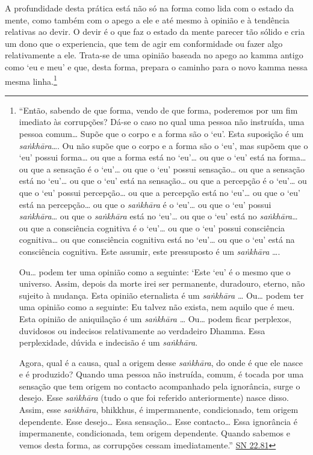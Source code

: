 A profundidade desta prática está não só na forma como lida com o estado da mente, como também com o apego a ele e até mesmo à opinião e à tendência relativas ao devir. O devir é o que faz o estado da mente parecer tão sólido e cria um dono que o experiencia, que tem de agir em conformidade ou fazer algo relativamente a ele. Trata-se de uma opinião baseada no apego ao kamma antigo como `eu e meu' e que, desta forma, prepara o caminho para o novo kamma nessa mesma linha.\footnote{``Então, sabendo de que forma, vendo de que forma, poderemos por um fim imediato às corrupções? Dá-se o caso no qual uma pessoa não instruída, uma pessoa comum\ldots{} Supõe que o corpo e a forma são o `eu'. Esta suposição é um \emph{saṅkhāra}\ldots{}. Ou não supõe que o corpo e a forma são o `eu', mas supõem que o `eu' possui forma\ldots{} ou que a forma está no `eu'\ldots{} ou que o `eu' está na forma\ldots{} ou que a sensação é o `eu'\ldots{} ou que o `eu' possui sensação\ldots{} ou que a sensação está no `eu'\ldots{} ou que o `eu' está na sensação\ldots{} ou que a percepção é o `eu'\ldots{} ou que o `eu' possui percepção\ldots{} ou que a percepção está no `eu'\ldots{} ou que o `eu' está na percepção\ldots{} ou que o \emph{saṅkhāra} é o `eu'\ldots{} ou que o `eu' possui \emph{saṅkhāra}\ldots{} ou que o \emph{saṅkhāra} está no `eu'\ldots{} ou que o `eu' está no \emph{saṅkhāra}\ldots{} ou que a consciência cognitiva é o `eu'\ldots{} ou que o `eu' possui consciência cognitiva\ldots{} ou que consciência cognitiva está no `eu'\ldots{} ou que o `eu' está na consciência cognitiva. Este assumir, este pressuposto é um \emph{saṅkhāra} \ldots.

  \hl{}

  Ou\ldots{} podem ter uma opinião como a seguinte: `Este `eu' é o mesmo que o universo. Assim, depois da morte irei ser permanente, duradouro, eterno, não sujeito à mudança.\textquotesingle{} Esta opinião eternalista é um \emph{saṅkhāra} \ldots{} Ou\ldots{} podem ter uma opinião como a seguinte: \textquotesingle Eu talvez não exista, nem aquilo que é meu\textquotesingle. Esta opinião de aniquilação é um \emph{saṅkhāra} \ldots{} Ou\ldots{} podem ficar perplexos, duvidosos ou indecisos relativamente ao verdadeiro Dhamma. Essa perplexidade, dúvida e indecisão é um \emph{saṅkhāra}.

  Agora, qual é a causa, qual a origem desse \emph{saṅkhāra}, do onde é que ele nasce e é produzido? Quando uma pessoa não instruída, comum, é tocada por uma sensação que tem origem no contacto acompanhado pela ignorância, surge o desejo. Esse \emph{saṅkhāra} (tudo o que foi referido anteriormente) nasce disso. Assim, esse \emph{saṅkhāra}, bhikkhus, é impermanente, condicionado, tem origem dependente. Esse desejo\ldots{} Essa sensação\ldots{} Esse contacto\ldots{} Essa ignorância é impermanente, condicionada, tem origem dependente. Quando sabemos e vemos desta forma, as corrupções cessam imediatamente.'' \href{https://suttacentral.net/sn22.81/en/bodhi}{SN 22.81}

}
